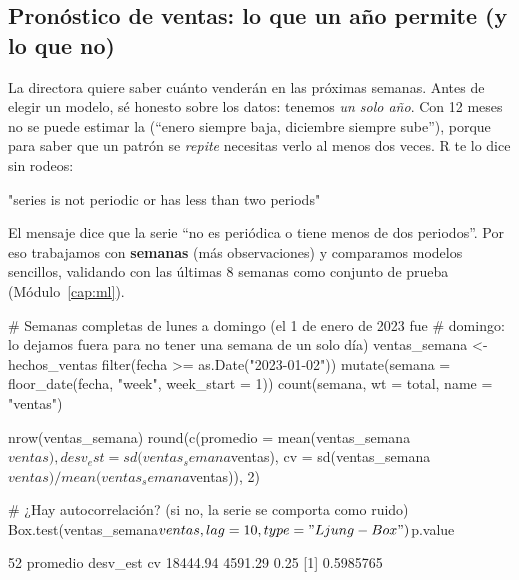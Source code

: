 \subsection{Pronóstico de ventas: lo que un año permite (y lo que no)}
\label{sec:m09-pronostico}

La directora quiere saber cuánto venderán en las próximas semanas. Antes de
elegir un modelo, sé honesto sobre los datos: tenemos \emph{un solo año}.
Con 12 meses no se puede estimar la  (``enero
siempre baja, diciembre siempre sube''), porque para saber que un patrón se
\emph{repite} necesitas verlo al menos dos veces. R te lo dice sin rodeos:


\begin{rsalida}
[1] "series is not periodic or has less than two periods"
\end{rsalida}

El mensaje dice que la serie ``no es periódica o tiene menos de dos
periodos''. Por eso trabajamos con \textbf{semanas} (más observaciones) y
comparamos modelos sencillos, validando con las últimas 8 semanas como
conjunto de prueba (Módulo~\ref{cap:ml}).

\begin{rcode}
# Semanas completas de lunes a domingo (el 1 de enero de 2023 fue
# domingo: lo dejamos fuera para no tener una semana de un solo día)
ventas_semana <- hechos_ventas %
  filter(fecha >= as.Date("2023-01-02")) %
  mutate(semana = floor_date(fecha, "week", week_start = 1)) %
  count(semana, wt = total, name = "ventas")

nrow(ventas_semana)
round(c(promedio = mean(ventas_semana$ventas),
        desv_est = sd(ventas_semana$ventas),
        cv = sd(ventas_semana$ventas) / mean(ventas_semana$ventas)), 2)

# ¿Hay autocorrelación? (si no, la serie se comporta como ruido)
Box.test(ventas_semana$ventas, lag = 10, type = "Ljung-Box")$p.value
\end{rcode}

\begin{rsalida}
[1] 52
promedio desv_est       cv 
18444.94  4591.29     0.25 
[1] 0.5985765
\end{rsalida}

